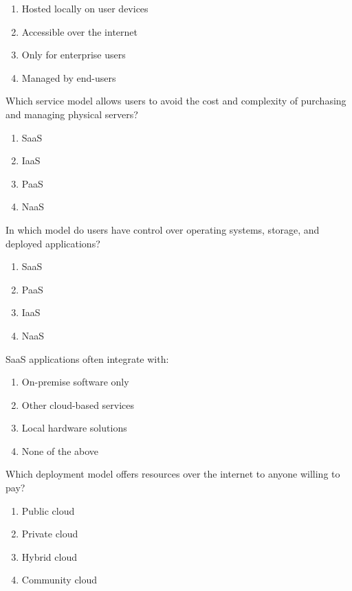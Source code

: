 \documentclass[11pt,a4paper]{article}
\begin{document}
\begin{parts}
\begin{enumerate}[label=(\alph*)]
    \item Hosted locally on user devices
    \item Accessible over the internet
    \item Only for enterprise users
    \item Managed by end-users
  \end{enumerate}
  
  \item Which service model allows users to avoid the cost and complexity of purchasing and managing physical servers?
  
\begin{enumerate}[label=(\alph*)]
    \item SaaS
    \item IaaS
    \item PaaS
    \item NaaS
  \end{enumerate}
  
  \item In which model do users have control over operating systems, storage, and deployed applications?
  
\begin{enumerate}[label=(\alph*)]
    \item SaaS
    \item PaaS
    \item IaaS
    \item NaaS
  \end{enumerate}
  
  \item SaaS applications often integrate with:
  
\begin{enumerate}[label=(\alph*)]
    \item On-premise software only
    \item Other cloud-based services
    \item Local hardware solutions
    \item None of the above
  \end{enumerate}
  
  \item Which deployment model offers resources over the internet to anyone willing to pay?
  
\begin{enumerate}[label=(\alph*)]
    \item Public cloud
    \item Private cloud
    \item Hybrid cloud
    \item Community cloud
  \end{enumerate}
  

\end{parts}
\end{document}
